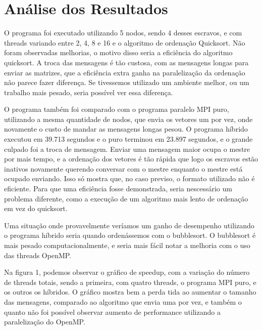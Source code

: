 \section{Análise dos Resultados}

O programa foi executado utilizando 5 nodos, sendo 4 desses escravos, e com threads variando entre 2, 4, 8 e 16 e o algoritmo de ordenação Quicksort. Não foram observadas melhorias, o motivo disso seria a eficiência do algoritmo quicksort. A troca das mensagens é tão custosa, com as mensagens longas para enviar as matrizes, que a eficiência extra ganha na paralelização da ordenação não parece fazer diferença. Se tivessemos utilizado um ambiente melhor, ou um trabalho mais pesado, seria possível ver essa diferença.

O programa também foi comparado com o programa paralelo MPI puro, utilizando a mesma quantidade de nodos, que envia os vetores um por vez, onde novamente o custo de mandar as mensagens longas pesou. O programa híbrido executou em 39.713 segundos e o puro terminou em 23.897 segundos, e o grande culpado foi a troca de mensagem. Enviar uma mensagem maior ocupa o mestre por mais tempo, e a ordenação dos vetores é tão rápida que logo os escravos estão inativos novamente querendo conversar com o mestre enquanto o mestre está ocupado enviando. Isso só mostra que, no caso previso, o formato utilizado não é eficiente. Para que uma eficiência fosse demonstrada, seria nescessário um problema diferente, como a execução de um algoritmo mais lento de ordenação em vez do quicksort.

Uma situação onde provavelmente veríamos um ganho de desempenho utilizando o programa híbrido seria quando ordenássemos com o bubblesort. O bubblesort é mais pesado computacionalmente, e seria mais fácil notar a melhoria com o uso das threads OpenMP.

Na figura 1, podemos observar o gráfico de speedup, com a variação do número de threads totais, sendo a primeira, com quatro threads, o programa MPI puro, e os outros os híbridos. O gráfico mostra bem a perda tida ao aumentar o tamanho das mensagens, comparado ao algoritmo que envia uma por vez, e também o quanto não foi possível observar aumento de performance utilizando a paralelização do OpenMP.